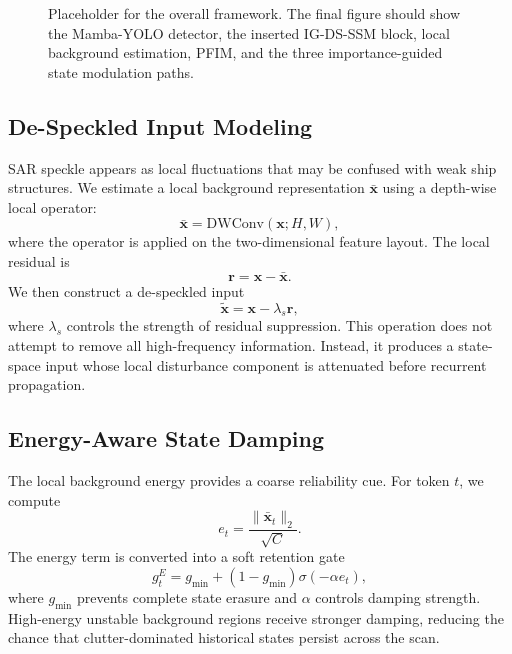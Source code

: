 \documentclass[letterpaper]{article}
\begin{document}
\begin{figure}[t]
  \centering
  \fbox{\rule{0pt}{1.25in}\rule{0.92\linewidth}{0pt}}
  \caption{Placeholder for the overall framework. The final figure should show the Mamba-YOLO detector, the inserted IG-DS-SSM block, local background estimation, PFIM, and the three importance-guided state modulation paths.}
  \label{fig:framework}
\end{figure}

\subsection{De-Speckled Input Modeling}

SAR speckle appears as local fluctuations that may be confused with weak ship structures. We estimate a local background representation $\bar{\mathbf{x}}$ using a depth-wise local operator:
\begin{equation}
  \bar{\mathbf{x}} = \mathrm{DWConv}(\mathbf{x}; H,W),
\end{equation}
where the operator is applied on the two-dimensional feature layout. The local residual is
\begin{equation}
  \mathbf{r} = \mathbf{x}-\bar{\mathbf{x}}.
\end{equation}
We then construct a de-speckled input
\begin{equation}
  \widetilde{\mathbf{x}} = \mathbf{x} - \lambda_s \mathbf{r},
  \label{eq:debiased}
\end{equation}
where $\lambda_s$ controls the strength of residual suppression. This operation does not attempt to remove all high-frequency information. Instead, it produces a state-space input whose local disturbance component is attenuated before recurrent propagation.

\subsection{Energy-Aware State Damping}

The local background energy provides a coarse reliability cue. For token $t$, we compute
\begin{equation}
  e_t = \frac{\|\bar{\mathbf{x}}_t\|_2}{\sqrt{C}}.
\end{equation}
The energy term is converted into a soft retention gate
\begin{equation}
  g^{E}_t = g_{\min} + (1-g_{\min})\sigma(-\alpha e_t),
\end{equation}
where $g_{\min}$ prevents complete state erasure and $\alpha$ controls damping strength. High-energy unstable background regions receive stronger damping, reducing the chance that clutter-dominated historical states persist across the scan.
\end{document}
